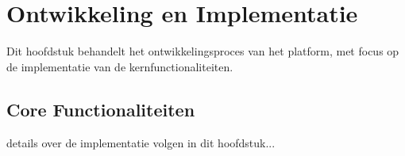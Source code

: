 \chapter{Ontwikkeling en Implementatie}
\label{ch:ontwikkeling}

Dit hoofdstuk behandelt het ontwikkelingsproces van het platform, met focus op de implementatie van de kernfunctionaliteiten.

\section{Core Functionaliteiten}
\label{sec:core-functionaliteiten}

details over de implementatie volgen in dit hoofdstuk...